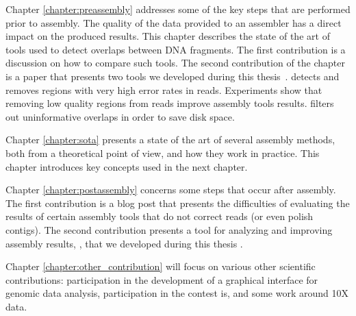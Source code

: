 \documentclass[./main.tex]{subfiles}
\begin{document}
Chapter \ref{chapter:preassembly} addresses some of the key steps that are performed prior to assembly. %
The quality of the data provided to an assembler has a direct impact on the produced results. %
This chapter describes the state of the art of tools used to detect overlaps between DNA fragments. The first contribution is a discussion on how to compare such tools. 
The second contribution of the chapter is a paper that presents two tools we developed during this thesis~\cite{yacrd}.
\yacrd  detects and removes regions with very high error rates in reads.
Experiments show that removing  low quality regions from reads improve assembly tools results. %
\fpa filters out uninformative overlaps in order to save disk space.

Chapter \ref{chapter:sota} presents a state of the art of several assembly methods, both from a theoretical point of view, and how they work in practice. This chapter introduces key concepts used in the next chapter.

Chapter \ref{chapter:postassembly} concerns some steps that occur after assembly. The first contribution is a blog post that presents the difficulties of evaluating the results of certain assembly tools that do not correct reads (or even polish contigs). The second contribution presents a tool for analyzing and improving assembly results, \knot, that we developed during this thesis \cite{knot}.

Chapter \ref{chapter:other_contribution} will focus on various other scientific contributions: participation in the development of a graphical interface for genomic data analysis, participation in the contest is, and some work around 10X data.
\end{document}
